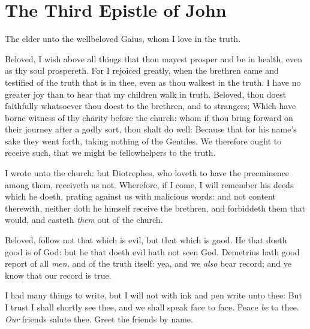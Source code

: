 \documentclass[11pt,letterpaper,oneside]{memoir}
\begin{document}
\chapter[3 John]{The Third Epistle of John}
The elder unto the wellbeloved Gaius, whom I love in the truth.

Beloved, I wish above all things that thou mayest prosper and be in
health, even as thy soul prospereth. For I rejoiced greatly, when the
brethren came and testified of the truth that is in thee, even as thou
walkest in the truth. I have no greater joy than to hear that my
children walk in truth. Beloved, thou doest faithfully whatsoever thou
doest to the brethren, and to strangers; Which have borne witness of thy
charity before the church: whom if thou bring forward on their journey
after a godly sort, thou shalt do well: Because that for his name's sake
they went forth, taking nothing of the Gentiles. We therefore ought to
receive such, that we might be fellowhelpers to the truth.

I wrote unto the church: but Diotrephes, who loveth to have the
preeminence among them, receiveth us not. Wherefore, if I come, I will
remember his deeds which he doeth, prating against us with malicious
words: and not content therewith, neither doth he himself receive the
brethren, and forbiddeth them that would, and casteth \emph{them} out of
the church.

Beloved, follow not that which is evil, but that which is good. He that
doeth good is of God: but he that doeth evil hath not seen God.
Demetrius hath good report of all \emph{men,} and of the truth itself:
yea, and we \emph{also} bear record; and ye know that our record is
true.

I had many things to write, but I will not with ink and pen write unto
thee: But I trust I shall shortly see thee, and we shall speak face to
face. Peace \emph{be} to thee. \emph{Our} friends salute thee. Greet the
friends by name.
\end{document}
